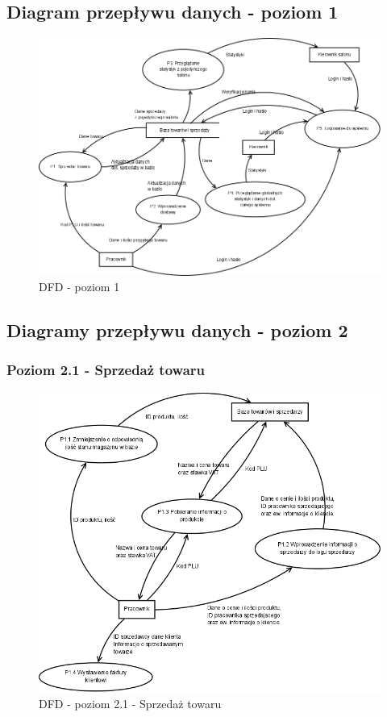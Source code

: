 \subsection{Diagram przepływu danych - poziom 1}
\begin{figure}[h]
\includegraphics[width=1\textwidth]{gfx/dfd-1.png}
\caption{DFD - poziom 1}
\end{figure}
\clearpage
\subsection{Diagramy przepływu danych - poziom 2}
\subsubsection{Poziom 2.1 - Sprzedaż towaru}
\begin{figure}[h]
\includegraphics[width=1\textwidth]{gfx/dfd-2-1.png}
\caption{DFD - poziom 2.1 - Sprzedaż towaru}
\end{figure}
\clearpage
